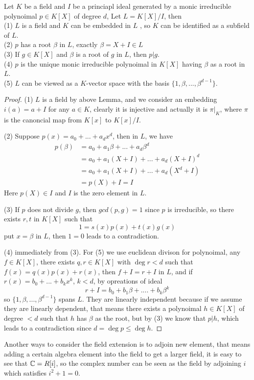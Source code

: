 \documentclass[en,geye,blue,normal,12pt]{elegantnote}
\begin{document}
\begin{proposition}
  Let \(K\) be a field and \(I\) be a princiapl ideal generated by a monic irreducible polynoimal \(p \in K[X]\) of degree \(d\), Let \(L = K[X]/I\), then\\
  (1) \(L\) is a field and \(K\) can be embedded in \(L\) , so \(K\) can be identified as a subfield of \(L\).
  \\
  (2) \(p\) has a root \(\beta\) in \(L\), exactly \(\beta = X + I \in L\) \\
  (3) If \(g \in K[X]\) and \(\beta\) is a root of \(g\) in  \(L\), then \(p|g\).\\
  (4) \(p\) is the unique monic irreducible polynoimal in \(K[X]\) having \(\beta\) as a root in \(L\).\\
  (5) \(L\) can be viewed as a \(K\)-vector space with the basis \(\{1,\beta,...,\beta^{d-1}\}\).

  \begin{proof}
    (1) \(L\) is a field by above Lemma, and we consider an embedding \(i(a) = a+I\) for any \(a \in K\), clearly it is injective and actually it is \(\pi|_K\), where \(\pi\) is the canoncial map from \(K[x]\) to \(K[x]/I\).

    (2) Suppose \(p(x) = a_0+...+a_dx^d \), then in \(L\), we have
    \begin{align*}
      p(\beta) & = a_0+a_1\beta+...+a_d\beta^d \\
      &= a_0+a_1(X+I)+...+a_d(X+I)^d \\
      &= a_0+a_1(X+I)+...+a_d(X^d+I) \\
      &= p(X)+I=I
    \end{align*}
    Here \(p(X) \in I\) and \(I\) is the zero element in \(L\).

    (3) If \(p\) does not divide \(g\), then \(gcd(p,g) = 1\) since \(p\) is irreducible, so there exists \(r, t\) in \(K[X]\) such that
    \[1 = s(x)p(x)+t(x)g(x)\]
    put \(x=\beta\) in \(L\), then \(1 = 0\) leads to a contradiction.

    (4) immediately from (3). For (5) we use euclidean divison for polynoimal, any \(f \in K[X]\), there exists \(q ,r \in K[X]\) with \(\deg r < d\) such that \( f(x) = q(x)p(x)+r(x)\), then \(f+ I = r + I\) in \(L\), and if \(r(x) = b_0+...+b_kx^k\), \(k < d\), by opreations of ideal
    \[r+I = b_0 + b_1\beta+....+ b_k\beta^k\]
    so \(\{1,\beta,...,\beta^{d-1}\} \) spans \(L\). They are linearly independent because if we assume they are linearly dependent, that means there exists a polynoimal \(h \in K[X]\) of degree \(< d\) such that \(h\) has \(\beta\) as the root, but by (3) we know that \(p | h\), which leads to a contradiction since \(d= \deg p \leq \deg h \).
  \end{proof}

\end{proposition}
Another ways to consider the field extension is to adjoin new element, that means adding a certain algebra element into the field to get a larger field, it is easy to see that \(\mathbb{C} = R[i]\), so the complex number can be seen as the field by adjoining \(i\) which satisfies \(i^2+1 = 0\).
\end{document}
